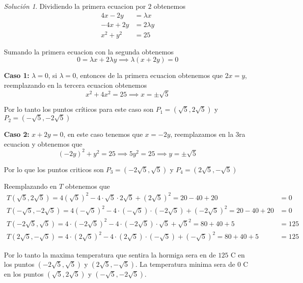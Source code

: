 \documentclass[a4paper,oneside,10.5pt]{article}
\theoremstyle{definition}
\theoremstyle{plain}
\theoremstyle{remark}
\theoremstyle{theorem}
\newtheorem{sol}{Solución}
\begin{document}
\begin{sol}
    Dividiendo la primera ecuacion por $2$ obtenemos
    \begin{align*}
        4x - 2y &= \lambda x\\
        -4x + 2y &= 2\lambda y\\
        x^2 + y^2 &= 25
    \end{align*}

    Sumando la primera ecuacion con la segunda obtenemos
    \begin{equation*}
        0 = \lambda x + 2\lambda y \implies \lambda(x + 2y) = 0
    \end{equation*}

    \textbf{Caso 1: }$\lambda = 0$, si $\lambda = 0$, entonces de la primera ecuacion obtenemos que $2x = y$, reemplazando en la tercera ecuacion obtenemos
    \begin{equation*}
        x^2 + 4x^2 = 25 \implies x = \pm \sqrt{5}
    \end{equation*}

    Por lo tanto los puntos críticos para este caso son $P_1 = (\sqrt{5}, 2 \sqrt{5})$ y $P_2 = (-\sqrt{5}, -2\sqrt{5})$

    \textbf{Caso 2: } $x + 2y = 0$, en este caso tenemos que $x = -2y$, reemplazamos en la 3ra ecuacion y obtenemos que
    \begin{equation*}
        {(-2y)}^{2} + y^2 = 25 \implies 5y^2 = 25 \implies y = \pm \sqrt{5}
    \end{equation*}

    Por lo que los puntos criticos son $P_3 = (-2\sqrt{5}, \sqrt{5})$ y $P_4 = (2\sqrt{5}, -\sqrt{5})$

    Reemplazando en $T$ obtenemos que
    \begin{align*}
        T(\sqrt5, 2\sqrt5) = 4{(\sqrt5)}^2 - 4 \cdot \sqrt{5} \cdot 2\sqrt5 + {(2\sqrt{5})}^2 = 20 - 40 + 20 &= 0\\
        T(-\sqrt5, -2\sqrt5) = 4{(-\sqrt5)}^2 - 4 \cdot (-\sqrt5) \cdot (-2\sqrt5) + {(-2\sqrt5)}^2 = 20 - 40 + 20 &= 0\\
        T(-2\sqrt5, \sqrt5) = 4\cdot {(-2\sqrt5)}^2 -4\cdot(-2\sqrt5)\cdot\sqrt5 + \sqrt5^2 = 80 + 40 + 5 &= 125\\
        T(2\sqrt5, -\sqrt5) = 4 \cdot {(2\sqrt5)}^2 - 4 \cdot (2\sqrt5) \cdot (-\sqrt5) + {(-\sqrt5)}^2 = 80 + 40 + 5 &= 125
    \end{align*}

    Por lo tanto la maxima temperatura que sentira la hormiga sera en de $125$ C en los puntos $(-2\sqrt5, \sqrt5)$ y $(2\sqrt5, -\sqrt5)$. La temperatura minima sera de $0$ C en los puntos $(\sqrt5, 2\sqrt5)$ y $(-\sqrt5, -2\sqrt5)$.
\end{sol}
\end{document}
